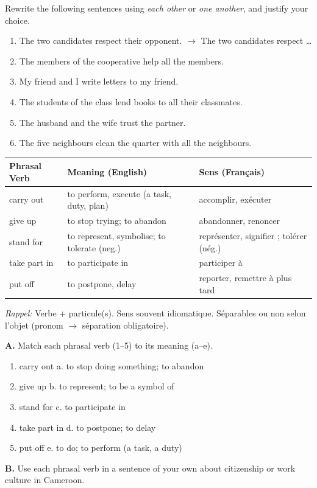 \documentclass[11pt]{article}
\begin{document}
\begin{exercice}
Rewrite the following sentences using \emph{each other} or \emph{one another}, and justify your choice.
\begin{enumerate}
\item The two candidates respect their opponent. $\rightarrow$ The two candidates respect \ldots
\item The members of the cooperative help all the members.
\item My friend and I write letters to my friend.
\item The students of the class lend books to all their classmates.
\item The husband and the wife trust the partner.
\item The five neighbours clean the quarter with all the neighbours.
\end{enumerate}
\end{exercice}

\begin{aretenir}
\begin{center}
\begin{tabularx}{\linewidth}{|l|X|X|}\hline
\textbf{Phrasal Verb} & \textbf{Meaning (English)} & \textbf{Sens (Français)} \\ \hline
carry out & to perform, execute (a task, duty, plan) & accomplir, exécuter \\ \hline
give up & to stop trying; to abandon & abandonner, renoncer \\ \hline
stand for & to represent, symbolise; to tolerate (neg.) & représenter, signifier ; tolérer (nég.) \\ \hline
take part in & to participate in & participer à \\ \hline
put off & to postpone, delay & reporter, remettre à plus tard \\ \hline
\end{tabularx}
\end{center}
\emph{Rappel:} Verbe + particule(s). Sens souvent idiomatique. Séparables ou non selon l'objet (pronom $\rightarrow$ séparation obligatoire).
\end{aretenir}

\begin{exercice}
\textbf{A.} Match each phrasal verb (1--5) to its meaning (a--e).
\begin{enumerate}
\item carry out \quad a. to stop doing something; to abandon
\item give up \quad b. to represent; to be a symbol of
\item stand for \quad c. to participate in
\item take part in \quad d. to postpone; to delay
\item put off \quad e. to do; to perform (a task, a duty)
\end{enumerate}
\textbf{B.} Use each phrasal verb in a sentence of your own about citizenship or work culture in Cameroon.
\end{exercice}
\end{document}
